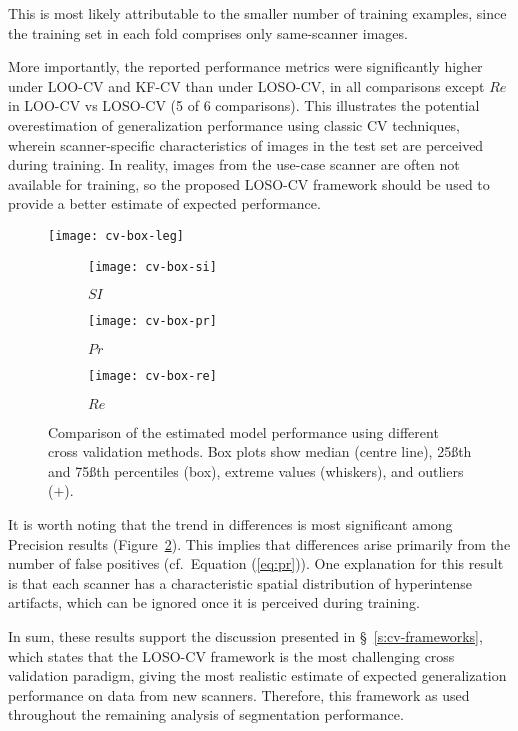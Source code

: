 This is most likely attributable to the smaller number of training examples,
since the training set in each fold comprises only same-scanner images.
\par
More importantly, the reported performance metrics
were significantly higher under LOO-CV and KF-CV than under LOSO-CV,
in all comparisons except $Re$ in LOO-CV vs LOSO-CV (5 of 6 comparisons).
This illustrates the potential overestimation of generalization performance
using classic CV techniques,
wherein scanner-specific characteristics of images in the test set
are perceived during training.
In reality, images from the use-case scanner are often not available for training,
so the proposed LOSO-CV framework should be used
to provide a better estimate of expected performance.
\par
\begin{figure}
  \centering
  \texttt{[image: cv-box-leg]}\\[0.5em]
  \begin{subfigure}{0.32\textwidth}
    \centering\texttt{[image: cv-box-si]}
    \caption{$SI$}%
    \label{fig:seg-box-cv-si}
  \end{subfigure}
  \begin{subfigure}{0.32\textwidth}
    \centering\texttt{[image: cv-box-pr]}
    \caption{$Pr$}%
    \label{fig:seg-box-cv-pr}
  \end{subfigure}
  \begin{subfigure}{0.32\textwidth}
    \centering\texttt{[image: cv-box-re]}
    \caption{$Re$}%
    \label{fig:seg-box-cv-re}
  \end{subfigure}
  \caption{Comparison of the estimated model performance
    using different cross validation methods.
    Box plots show
    median (centre line), 25\ss{th} and 75\ss{th} percentiles (box),
    extreme values (whiskers), and outliers ($+$).}%
  \label{fig:seg-box-cv}
\end{figure}
It is worth noting that the trend in differences
is most significant among Precision results (Figure~\ref{fig:seg-box-cv-pr}).
This implies that differences arise primarily from
the number of false positives (cf.~Equation (\ref{eq:pr})).
One explanation for this result is that each scanner has
a characteristic spatial distribution of hyperintense artifacts,
which can be ignored once it is perceived during training.
\par
In sum, these results support the discussion presented in \S~\ref{s:cv-frameworks},
which states that the LOSO-CV framework is the most challenging
cross validation paradigm, giving the most realistic estimate of
expected generalization performance on data from new scanners.
Therefore, this framework as used throughout the remaining analysis of segmentation performance.

